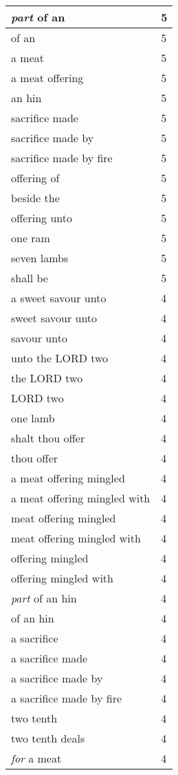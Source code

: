 \begin{center}
\begin{longtable}{|p{3.0in}|p{0.5in}|}
\emph{part} of an & 5\\ \hline 
of an & 5\\ \hline 
a meat & 5\\ \hline 
a meat offering & 5\\ \hline 
an hin & 5\\ \hline 
sacrifice made & 5\\ \hline 
sacrifice made by & 5\\ \hline 
sacrifice made by fire & 5\\ \hline 
offering of & 5\\ \hline 
beside the & 5\\ \hline 
offering unto & 5\\ \hline 
one ram & 5\\ \hline 
seven lambs & 5\\ \hline 
shall be & 5\\ \hline 
a sweet savour unto & 4\\ \hline 
sweet savour unto & 4\\ \hline 
savour unto & 4\\ \hline 
unto the LORD two & 4\\ \hline 
the LORD two & 4\\ \hline 
LORD two & 4\\ \hline 
one lamb & 4\\ \hline 
shalt thou offer & 4\\ \hline 
thou offer & 4\\ \hline 
a meat offering mingled & 4\\ \hline 
a meat offering mingled with & 4\\ \hline 
meat offering mingled & 4\\ \hline 
meat offering mingled with & 4\\ \hline 
offering mingled & 4\\ \hline 
offering mingled with & 4\\ \hline 
\emph{part} of an hin & 4\\ \hline 
of an hin & 4\\ \hline 
a sacrifice & 4\\ \hline 
a sacrifice made & 4\\ \hline 
a sacrifice made by & 4\\ \hline 
a sacrifice made by fire & 4\\ \hline 
two tenth & 4\\ \hline 
two tenth deals & 4\\ \hline 
\emph{for} a meat & 4\\ \hline 

\end{longtable}
\end{center}

